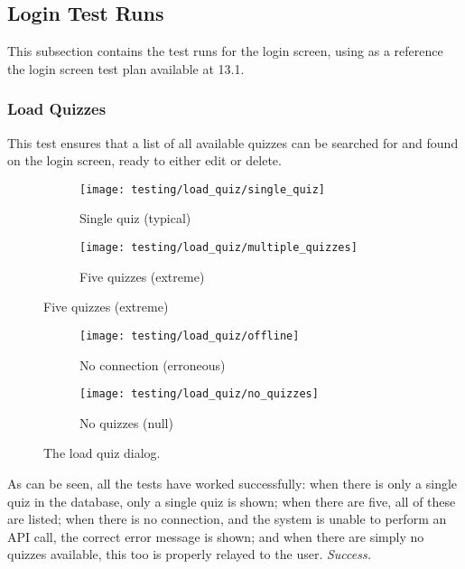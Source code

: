 \subsection{Login Test Runs}
This subsection contains the test runs for the login screen, using as a reference the login screen test plan available at 13.1.

\subsubsection{Load Quizzes}
This test ensures that a list of all available quizzes can be searched for and found on the login screen, ready to either edit or delete.

\begin{figure}[!htbp]
\centering
\begin{subfigure}{0.5\textwidth}
  \centering
  \texttt{[image: testing/load\_quiz/single\_quiz]}
  \caption{Single quiz (typical)}
  \label{fig:sub1}
\end{subfigure}%
\begin{subfigure}{0.5\textwidth}
  \centering
  \texttt{[image: testing/load\_quiz/multiple\_quizzes]}
  \caption{Five quizzes (extreme)}
  \label{fig:sub2}
\end{subfigure}
\label{fig:test}
\end{figure}

\begin{figure}[!htbp]
\centering
\begin{subfigure}{0.5\textwidth}
  \centering
  \texttt{[image: testing/load\_quiz/offline]}
  \setcounter{subfigure}{2}%
  \caption{No connection (erroneous)}
  \label{fig:sub1}
\end{subfigure}%
\begin{subfigure}{0.5\textwidth}
  \centering
  \texttt{[image: testing/load\_quiz/no\_quizzes]}
  \setcounter{subfigure}{3}%
  \caption{No quizzes (null)}
  \label{fig:sub2}
\end{subfigure}
\caption{The load quiz dialog.}
\label{fig:test}
\end{figure}

As can be seen, all the tests have worked successfully: when there is only a single quiz in the database, only a single quiz is shown; when there are five, all of these are listed; when there is no connection, and the system is unable to perform an API call, the correct error message is shown; and when there are simply no quizzes available, this too is properly relayed to the user. \textit{Success.}


